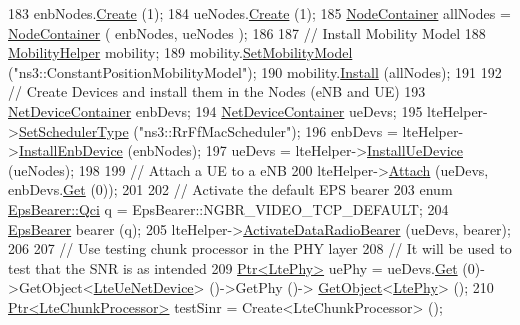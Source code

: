 \begin{DoxyCode}
183   enbNodes.\hyperlink{classns3_1_1NodeContainer_a787f059e2813e8b951cc6914d11dfe69}{Create} (1);
184   ueNodes.\hyperlink{classns3_1_1NodeContainer_a787f059e2813e8b951cc6914d11dfe69}{Create} (1);
185   \hyperlink{classns3_1_1NodeContainer}{NodeContainer} allNodes = \hyperlink{classns3_1_1NodeContainer}{NodeContainer} ( enbNodes, ueNodes );
186 
187   \textcolor{comment}{// Install Mobility Model}
188   \hyperlink{classns3_1_1MobilityHelper}{MobilityHelper} mobility;
189   mobility.\hyperlink{classns3_1_1MobilityHelper_a030275011b6f40682e70534d30280aba}{SetMobilityModel} (\textcolor{stringliteral}{"ns3::ConstantPositionMobilityModel"});
190   mobility.\hyperlink{classns3_1_1MobilityHelper_a07737960ee95c0777109cf2994dd97ae}{Install} (allNodes);
191 
192   \textcolor{comment}{// Create Devices and install them in the Nodes (eNB and UE)}
193   \hyperlink{classns3_1_1NetDeviceContainer}{NetDeviceContainer} enbDevs;
194   \hyperlink{classns3_1_1NetDeviceContainer}{NetDeviceContainer} ueDevs;
195   lteHelper->\hyperlink{classns3_1_1LteHelper_a8f86e55b8b80a81732c4b2df00fb25d5}{SetSchedulerType} (\textcolor{stringliteral}{"ns3::RrFfMacScheduler"});
196   enbDevs = lteHelper->\hyperlink{classns3_1_1LteHelper_a5e009ad35ef85f46b5a6099263f15a03}{InstallEnbDevice} (enbNodes);
197   ueDevs = lteHelper->\hyperlink{classns3_1_1LteHelper_ac9cd932d7de92811cfa953c2e3b2fc9f}{InstallUeDevice} (ueNodes);
198 
199   \textcolor{comment}{// Attach a UE to a eNB}
200   lteHelper->\hyperlink{classns3_1_1LteHelper_a9466743f826aa2652a87907b7f0a1c87}{Attach} (ueDevs, enbDevs.\hyperlink{classns3_1_1NetDeviceContainer_a677d62594b5c9d2dea155cc5045f4d0b}{Get} (0));
201 
202   \textcolor{comment}{// Activate the default EPS bearer}
203   \textcolor{keyword}{enum} \hyperlink{structns3_1_1EpsBearer_aecf0c67109c5eb4ec0b07226fff5885e}{EpsBearer::Qci} q = EpsBearer::NGBR\_VIDEO\_TCP\_DEFAULT;
204   \hyperlink{structns3_1_1EpsBearer}{EpsBearer} bearer (q);
205   lteHelper->\hyperlink{classns3_1_1LteHelper_ac896e16cf162e4beeaa292d39ab1b700}{ActivateDataRadioBearer} (ueDevs, bearer);
206 
207   \textcolor{comment}{// Use testing chunk processor in the PHY layer}
208   \textcolor{comment}{// It will be used to test that the SNR is as intended}
209   \hyperlink{classns3_1_1Ptr}{Ptr<LtePhy>} uePhy = ueDevs.\hyperlink{classns3_1_1NetDeviceContainer_a677d62594b5c9d2dea155cc5045f4d0b}{Get} (0)->GetObject<\hyperlink{classns3_1_1LteUeNetDevice}{LteUeNetDevice}> ()->GetPhy ()->
      \hyperlink{classns3_1_1Object_a13e18c00017096c8381eb651d5bd0783}{GetObject}<\hyperlink{classns3_1_1LtePhy}{LtePhy}> ();
210   \hyperlink{classns3_1_1Ptr}{Ptr<LteChunkProcessor>} testSinr = Create<LteChunkProcessor> ();

\end{DoxyCode}
